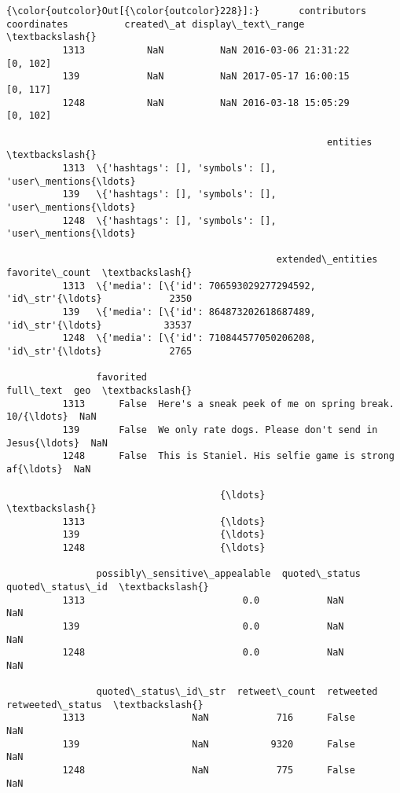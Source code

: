 \documentclass[11pt]{article}
\begin{document}
\begin{Verbatim}[commandchars=\\\{\}]
{\color{outcolor}Out[{\color{outcolor}228}]:}       contributors  coordinates          created\_at display\_text\_range  \textbackslash{}
          1313           NaN          NaN 2016-03-06 21:31:22           [0, 102]   
          139            NaN          NaN 2017-05-17 16:00:15           [0, 117]   
          1248           NaN          NaN 2016-03-18 15:05:29           [0, 102]   
          
                                                         entities  \textbackslash{}
          1313  \{'hashtags': [], 'symbols': [], 'user\_mentions{\ldots}   
          139   \{'hashtags': [], 'symbols': [], 'user\_mentions{\ldots}   
          1248  \{'hashtags': [], 'symbols': [], 'user\_mentions{\ldots}   
          
                                                extended\_entities  favorite\_count  \textbackslash{}
          1313  \{'media': [\{'id': 706593029277294592, 'id\_str'{\ldots}            2350   
          139   \{'media': [\{'id': 864873202618687489, 'id\_str'{\ldots}           33537   
          1248  \{'media': [\{'id': 710844577050206208, 'id\_str'{\ldots}            2765   
          
                favorited                                          full\_text  geo  \textbackslash{}
          1313      False  Here's a sneak peek of me on spring break. 10/{\ldots}  NaN   
          139       False  We only rate dogs. Please don't send in Jesus{\ldots}  NaN   
          1248      False  This is Staniel. His selfie game is strong af{\ldots}  NaN   
          
                                      {\ldots}                          \textbackslash{}
          1313                        {\ldots}                           
          139                         {\ldots}                           
          1248                        {\ldots}                           
          
                possibly\_sensitive\_appealable  quoted\_status quoted\_status\_id  \textbackslash{}
          1313                            0.0            NaN              NaN   
          139                             0.0            NaN              NaN   
          1248                            0.0            NaN              NaN   
          
                quoted\_status\_id\_str  retweet\_count  retweeted  retweeted\_status  \textbackslash{}
          1313                   NaN            716      False               NaN   
          139                    NaN           9320      False               NaN   
          1248                   NaN            775      False               NaN   
          

\end{Verbatim}
\end{document}
